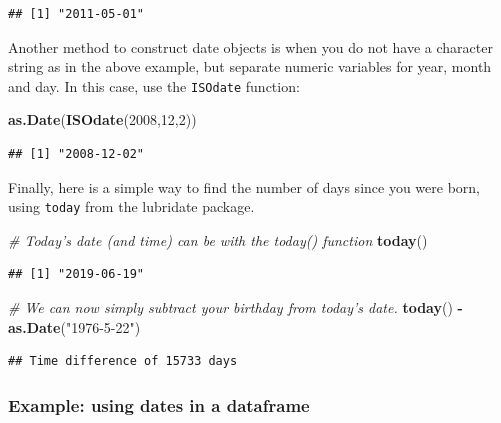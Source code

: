 \documentclass[]{book}
\newenvironment{Shaded}{\begin{snugshade}}{\end{snugshade}}
\newcommand{\CommentTok}[1]{\textcolor[rgb]{0.56,0.35,0.01}{\textit{#1}}}
\newcommand{\DecValTok}[1]{\textcolor[rgb]{0.00,0.00,0.81}{#1}}
\newcommand{\KeywordTok}[1]{\textcolor[rgb]{0.13,0.29,0.53}{\textbf{#1}}}
\newcommand{\NormalTok}[1]{#1}
\newcommand{\OperatorTok}[1]{\textcolor[rgb]{0.81,0.36,0.00}{\textbf{#1}}}
\newcommand{\StringTok}[1]{\textcolor[rgb]{0.31,0.60,0.02}{#1}}
\begin{document}
\begin{verbatim}
## [1] "2011-05-01"
\end{verbatim}

Another method to construct date objects is when you do not have a character string as in the above example, but separate numeric variables for year, month and day. In this case, use the \texttt{ISOdate} function:

\begin{Shaded}
\begin{Highlighting}[]
\KeywordTok{as.Date}\NormalTok{(}\KeywordTok{ISOdate}\NormalTok{(}\DecValTok{2008}\NormalTok{,}\DecValTok{12}\NormalTok{,}\DecValTok{2}\NormalTok{))}
\end{Highlighting}
\end{Shaded}

\begin{verbatim}
## [1] "2008-12-02"
\end{verbatim}

Finally, here is a simple way to find the number of days since you were born, using \texttt{today} from the lubridate package.

\begin{Shaded}
\begin{Highlighting}[]
\CommentTok{# Today's date (and time) can be with the today() function}
\KeywordTok{today}\NormalTok{()}
\end{Highlighting}
\end{Shaded}

\begin{verbatim}
## [1] "2019-06-19"
\end{verbatim}

\begin{Shaded}
\begin{Highlighting}[]
\CommentTok{# We can now simply subtract your birthday from today's date.}
\KeywordTok{today}\NormalTok{() }\OperatorTok{-}\StringTok{ }\KeywordTok{as.Date}\NormalTok{(}\StringTok{"1976-5-22"}\NormalTok{)}
\end{Highlighting}
\end{Shaded}

\begin{verbatim}
## Time difference of 15733 days
\end{verbatim}

\hypertarget{datesdataframe}{%
\subsubsection{Example: using dates in a dataframe}\label{datesdataframe}}
\end{document}
